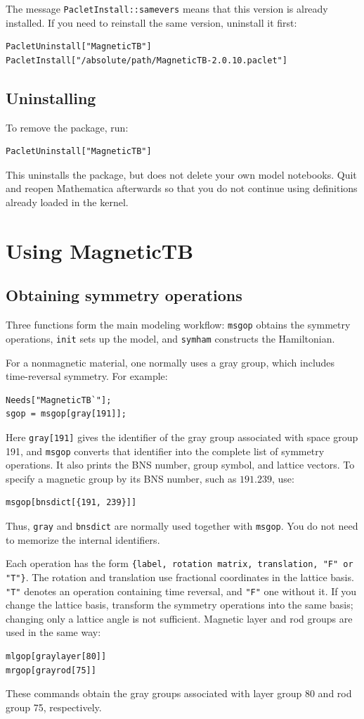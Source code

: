 \documentclass[titlepage,a4paper,12pt]{article}
\begin{document}
The message \lstinline|PacletInstall::samevers| means that this version is
already installed. If you need to reinstall the same version, uninstall it first:
\begin{lstlisting}[numbers=none]
PacletUninstall["MagneticTB"]
PacletInstall["/absolute/path/MagneticTB-2.0.10.paclet"]
\end{lstlisting}

\subsection{Uninstalling}
To remove the package, run:
\begin{lstlisting}[numbers=none]
PacletUninstall["MagneticTB"]
\end{lstlisting}
This uninstalls the package, but does not delete your own model notebooks.
Quit and reopen Mathematica afterwards so that you do not continue using
definitions already loaded in the kernel.

\section{Using MagneticTB}
\subsection{Obtaining symmetry operations}
Three functions form the main modeling workflow:
\lstinline|msgop| obtains the symmetry operations, \lstinline|init| sets up the
model, and \lstinline|symham| constructs the Hamiltonian.

For a nonmagnetic material, one normally uses a gray group, which includes
time-reversal symmetry. For example:
\begin{lstlisting}
Needs["MagneticTB`"];
sgop = msgop[gray[191]];
\end{lstlisting}
Here \lstinline|gray[191]| gives the identifier of the gray group associated
with space group 191, and \lstinline|msgop| converts that identifier into the
complete list of symmetry operations. It also prints the BNS number, group
symbol, and lattice vectors. To specify a magnetic group by its BNS number,
such as $191.239$, use:
\begin{lstlisting}[numbers=none]
msgop[bnsdict[{191, 239}]]
\end{lstlisting}
Thus, \lstinline|gray| and \lstinline|bnsdict| are normally used together with
\lstinline|msgop|. You do not need to memorize the internal identifiers.

Each operation has the form
\lstinline|{label, rotation matrix, translation, "F" or "T"}|.
The rotation and translation use fractional coordinates in the lattice basis.
\lstinline|"T"| denotes an operation containing time reversal, and
\lstinline|"F"| one without it. If you change the lattice basis, transform the
symmetry operations into the same basis; changing only a lattice angle is not
sufficient. Magnetic layer and rod groups are used in the same way:
\begin{lstlisting}[numbers=none]
mlgop[graylayer[80]]
mrgop[grayrod[75]]
\end{lstlisting}
These commands obtain the gray groups associated with layer group 80 and rod
group 75, respectively.
\end{document}
